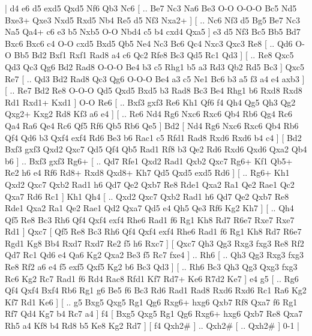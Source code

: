 \makegametitle 
|   d4   e6    d5   exd5    Qxd5   Nf6    Qb3   Nc6 [ .. Be7  Nc3 Na6  Be3 O-O  O-O-O Bc5  Nd5 Bxe3+  Qxe3 Nxd5  Rxd5 Nb4  Re5 d5  Nf3 Nxa2+   ]  [ .. Nc6  Nf3 d5  Bg5 Be7  Nc3 Na5  Qa4+ c6  e3 b5  Nxb5 O-O  Nbd4 c5  b4 cxd4  Qxa5   ]  e3   d5    Nf3   Bc5    Bb5   Bd7    Bxc6   Bxc6    c4   O-O    cxd5   Bxd5    Qb5   Ne4    Nc3   Bc6    Qc4   Nxc3    Qxc3   Re8 [ .. Qd6  O-O Bb5  Bd2 Bxf1  Rxf1 Rad8  a4 c6  Qc2 Rfe8  Bc3 Qd5  Rc1 Qd3   ]  [ .. Re8  Qxc5 Qd3  Qc3 Qg6  Bd2 Rad8  O-O-O Be4  b3 c5  Rhg1 b5  a3 Rd3  Qb2 Rd5  Bc3   ]  Qxc5   Re7 [ .. Qd3  Bd2 Rad8  Qc3 Qg6  O-O-O Be4  a3 c5  Ne1 Bc6  b3 a5  f3 a4  e4 axb3   ]  [ .. Re7  Bd2 Re8  O-O-O Qd5  Qxd5 Bxd5  b3 Rad8  Bc3 Be4  Rhg1 b6  Rxd8 Rxd8  Rd1 Rxd1+  Kxd1   ]  O-O   Re6 [ .. Bxf3  gxf3 Re6  Kh1 Qf6  f4 Qh4  Qg5 Qh3  Qg2 Qxg2+  Kxg2 Rd8  Kf3 a6  e4   ]  [ .. Re6  Nd4 Rg6  Nxc6 Rxc6  Qb4 Rb6  Qg4 Rc6  Qa4 Ra6  Qe4 Rc6  Qf5 Rf6  Qb5 Rb6  Qe5   ]  Bd2 [  Nd4 Rg6  Nxc6 Rxc6  Qb4 Rb6  Qf4 Qd6  b3 Qxf4  exf4 Rd6  Be3 b6  Rac1 c5  Rfd1 Rad8  Rxd6 Rxd6  b4 c4   ]  [  Bd2 Bxf3  gxf3 Qxd2  Qxc7 Qd5  Qf4 Qb5  Rad1 Rf8  b3 Qe2  Rd6 Rxd6  Qxd6 Qxa2  Qb4 b6   ] .. Bxf3    gxf3   Rg6+ [ .. Qd7  Rfe1 Qxd2  Rad1 Qxb2  Qxc7 Rg6+  Kf1 Qb5+  Re2 h6  e4 Rf6  Rd8+ Rxd8  Qxd8+ Kh7  Qd5 Qxd5  exd5 Rd6   ]  [ .. Rg6+  Kh1 Qxd2  Qxc7 Qxb2  Rad1 h6  Qd7 Qe2  Qxb7 Re8  Rde1 Qxa2  Ra1 Qe2  Rae1 Qc2  Qxa7 Rd6  Rc1   ]  Kh1   Qh4 [ .. Qxd2  Qxc7 Qxb2  Rad1 h6  Qd7 Qe2  Qxb7 Re8  Rde1 Qxa2  Ra1 Qe2  Rae1 Qd2  Qxa7 Qd5  e4 Qh5  Qe3 Rf6  Kg2 Kh7   ]  [ .. Qh4  Qf5 Re8  Bc3 Rh6  Qf4 Qxf4  exf4 Rhe6  Rad1 f6  Rg1 Kh8  Rd7 R6e7  Rxe7 Rxe7  Rd1   ]  Qxc7 [  Qf5 Re8  Bc3 Rh6  Qf4 Qxf4  exf4 Rhe6  Rad1 f6  Rg1 Kh8  Rd7 R6e7  Rgd1 Kg8  Bb4 Rxd7  Rxd7 Re2  f5 h6  Rxc7   ]  [  Qxc7 Qh3  Qg3 Rxg3  fxg3 Re8  Rf2 Qd7  Rc1 Qd6  e4 Qa6  Kg2 Qxa2  Be3 f5  Rc7 fxe4   ] .. Rh6 [ .. Qh3  Qg3 Rxg3  fxg3 Re8  Rf2 a6  e4 f5  exf5 Qxf5  Kg2 b6  Bc3 Qd3   ]  [ .. Rh6  Bc3 Qh3  Qg3 Qxg3  fxg3 Rc6  Kg2 Rc7  Rad1 f6  Rd4 Rac8  Rfd1 Kf7  Rd7+ Ke6  R7d2 Ke7   ]  e4   g5 [ .. Rg6  Qf4 Qxf4  Bxf4 Rb6  Rg1 g6  Be5 f6  Bc3 Rd6  Rad1 Rad8  Rxd6 Rxd6  Rc1 Ra6  Kg2 Kf7  Rd1 Ke6   ]  [ .. g5  Bxg5 Qxg5  Rg1 Qg6  Rxg6+ hxg6  Qxb7 Rf8  Qxa7 f6  Rg1 Rf7  Qd4 Kg7  b4 Rc7  a4   ]  f4 [  Bxg5 Qxg5  Rg1 Qg6  Rxg6+ hxg6  Qxb7 Re8  Qxa7 Rh5  a4 Kf8  b4 Rd8  b5 Ke8  Kg2 Rd7   ]  [  f4 Qxh2#   ] .. Qxh2#    [ .. Qxh2#   ] 0-1  |

